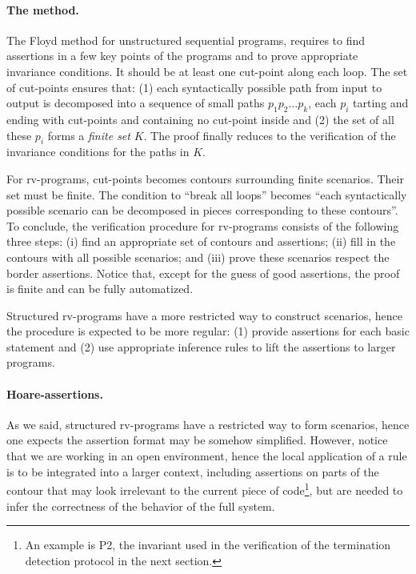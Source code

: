 \documentclass[runningheads]{llncs}
\newcommand{\1}{\u{a}}
\newcommand{\2}{\c{s}}
\newcommand{\5}{\c{t}}
\newcommand{\8}{\^{\i}}
\newcommand{\9}{\^{a}}
\newcommand{\foo}[1]{\footnote{#1}}
\begin{document}
\paragraph{The method.}

The Floyd method for unstructured sequential programs, requires to find assertions in a few key points of the
programs and to prove appropriate invariance conditions. It should be at least one cut-point along each loop.
The set of cut-points ensures that: (1) each syntactically possible path from input to output is decomposed
into a sequence of small paths $p_1p_2\dots p_k$, each $p_i$ tarting and ending with cut-points and containing
no cut-point inside and (2) the set of all these $p_i$ forms a {\em finite set} $K$.  The proof finally
reduces to the verification of the invariance conditions for the paths in $K$.

For rv-programs, cut-points becomes contours surrounding finite scenarios. Their set must be finite.  The
condition to ``break all loops'' becomes ``each syntactically possible scenario can be decomposed in pieces
corresponding to these contours''. To conclude, the verification procedure for rv-programs consists of the
following three steps: (i) find an appropriate set of contours and assertions; (ii) fill in the contours with
all possible scenarios; and (iii) prove these scenarios respect the border assertions.  Notice that, except
for the guess of good assertions, the proof is finite and can be fully automatized.

Structured rv-programs have a more restricted way to construct scenarios, hence the procedure is expected to
be more regular: (1) provide assertions for each basic statement and (2) use appropriate inference rules to
lift the assertions to larger programs.

\paragraph{Hoare-assertions.}

As we said, structured rv-programs have a restricted way to form scenarios, hence one expects the assertion
format may be somehow simplified. However, notice that we are working in an open environment, hence the local
application of a rule is to be integrated into a larger context, including assertions on parts of the contour
that may look irrelevant to the current piece of code\foo{An example is P2, the invariant used in the
  verification of the termination detection protocol in the next section.}, but are needed to infer the
correctness of the behavior of the full system.
\end{document}
